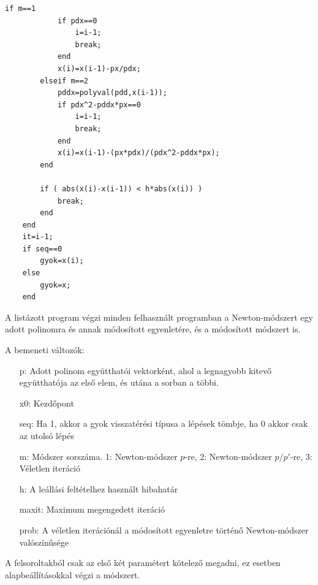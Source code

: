 \documentclass[a4paper,12pt]{report}
\begin{document}
\begin{appendices}
\begin{singlespace}
\begin{lstlisting}[caption=Newton.m]
        if m==1
            if pdx==0
                i=i-1;
                break;
            end
            x(i)=x(i-1)-px/pdx;
        elseif m==2
            pddx=polyval(pdd,x(i-1));
            if pdx^2-pddx*px==0
                i=i-1;
                break;
            end
            x(i)=x(i-1)-(px*pdx)/(pdx^2-pddx*px);
        end

        if ( abs(x(i)-x(i-1)) < h*abs(x(i)) )
            break;
        end
    end
    it=i-1;
    if seq==0
        gyok=x(i);
    else
        gyok=x;
    end
			\end{lstlisting}
            \end{singlespace}
			A listázott program végzi minden felhasznált programban a Newton-módszert egy adott polinomra és annak módosított egyenletére, és a módosított módszert is.

            A bemeneti változók:
			\begin{enumerate}
				\item[p:] Adott polinom együtthatói vektorként, ahol a legnagyobb kitevő együtthatója az első elem, és utána a sorban a többi.
				\item[x0:] Kezdőpont
				\item[seq:] Ha 1, akkor a gyok visszatérési típusa a lépések tömbje, ha 0 akkor csak az utolsó lépés
				\item[m:] Módszer sorszáma. 1: Newton-módszer $p$-re, 2: Newton-módszer $p/p'$-re, 3: Véletlen iteráció
				\item[h:] A leállási feltételhez használt hibahatár
				\item[maxit:] Maximum megengedett iteráció
				\item[prob:] A véletlen iterációnál a módosított egyenletre történő Newton-módszer valószínűsége
			\end{enumerate}
			A felsoroltakból csak az első két paramétert kötelező megadni, ez esetben alapbeállításokkal végzi a módszert.


























\end{appendices}
\end{document}
